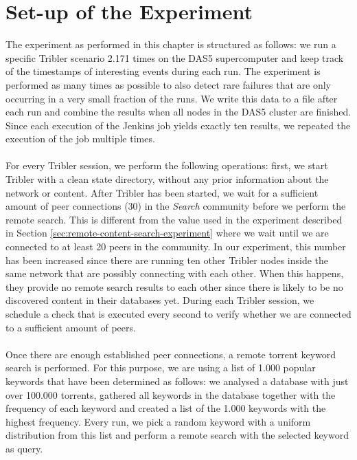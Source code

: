 \section{Set-up of the Experiment}
The experiment as performed in this chapter is structured as follows: we run a specific Tribler scenario 2.171 times on the DAS5 supercomputer and keep track of the timestamps of interesting events during each run. The experiment is performed as many times as possible to also detect rare failures that are only occurring in a very small fraction of the runs. We write this data to a file after each run and combine the results when all nodes in the DAS5 cluster are finished. Since each execution of the Jenkins job yields exactly ten results, we repeated the execution of the job multiple times.\\\\
For every Tribler session, we perform the following operations: first, we start Tribler with a clean state directory, without any prior information about the network or content. After Tribler has been started, we wait for a sufficient amount of peer  connections (30) in the \emph{Search} community before we perform the remote search. This is different from the value used in the experiment described in Section \ref{sec:remote-content-search-experiment} where we wait until we are connected to at least 20 peers in the community. In our experiment, this number has been increased since there are running ten other Tribler nodes inside the same network that are possibly connecting with each other. When this happens, they provide no remote search results to each other since there is likely to be no discovered content in their databases yet. During each Tribler session, we schedule a check that is executed every second to verify whether we are connected to a sufficient amount of peers.\\\\
Once there are enough established peer connections, a remote torrent keyword search is performed. For this purpose, we are using a list of 1.000 popular keywords that have been determined as follows: we analysed a database with just over 100.000 torrents, gathered all keywords in the database together with the frequency of each keyword and created a list of the 1.000 keywords with the highest frequency. Every run, we pick a random keyword with a uniform distribution from this list and perform a remote search with the selected keyword as query.\\\\
